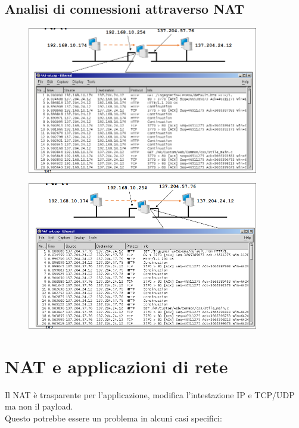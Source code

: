 \documentclass{report}
\begin{document}
            \subsection{Analisi di connessioni attraverso NAT}
                \begin{figure}[H]
                    \includegraphics[width=0.9\textwidth]{2/an1.png}
                \end{figure}
                \begin{figure}[H]
                    \includegraphics[width=0.9\textwidth]{2/an2.png}
                \end{figure}
        \section{NAT e applicazioni di rete}
            Il NAT è trasparente per l'applicazione, modifica l'intestazione IP e TCP/UDP ma non il payload.
            \\
            Questo potrebbe essere un problema in alcuni casi specifici:
\end{document}
